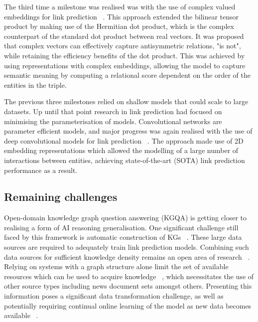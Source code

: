 \noindent The third time a milestone was realised was with the use of complex valued embeddings for link prediction \unskip~\citep{trouillon2016complex}. This approach extended the bilinear tensor product by making use of the Hermitian dot product, which is the complex counterpart of the standard dot product between real vectors. It was proposed that complex vectors can effectively capture antisymmetric relations, "is not", while retaining the efficiency benefits of the dot product. This was achieved by using representations with complex embeddings, allowing the model to capture semantic meaning by computing a relational score dependent on the order of the entities in the triple. \par
 
\noindent The previous three milestones relied on shallow models that could scale to large datasets. Up until that point research in link prediction had focused on minimising the parameterisation of models. Convolutional networks are parameter efficient models, and major progress was again realised with the use of deep convolutional models for link prediction \unskip~\citep{dettmers2018convolutional}. The approach made use of 2D embedding representations which allowed the modelling of a large number of interactions between entities, achieving state-of-the-art (SOTA) link prediction performance as a result. \par

\subsection{Remaining challenges}

\noindent Open-domain knowledge graph question answering (KGQA) is getting closer to realising a form of AI reasoning generalisation. One significant challenge still faced by this framework is automatic construction of KGs \unskip~\citep{dong2014knowledge}. These large data sources are required to adequately train link prediction models. Combining such data sources for sufficient knowledge density remains an open area of research \unskip~\citep{diefenbach2018wdaqua}. Relying on systems with a graph structure alone limit the set of available resources which can be used to acquire knowledge \unskip~\citep{chen2017reading}, which necessitates the use of other source types including news document sets amongst others. Presenting this information poses a significant data transformation challenge, as well as potentially requiring continual online learning of the model as new data becomes available \unskip~\citep{abujabal2018never}. \par

